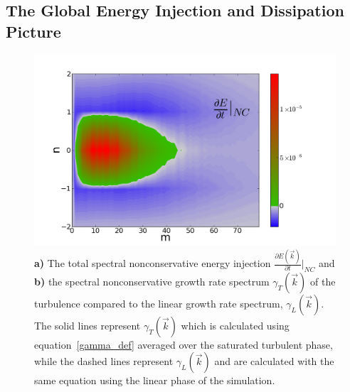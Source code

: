\documentclass[showpacs,preprintnumbers,amsmath,amssymb,superscriptaddress,aip]{revtex4-1}
\newcommand{\pdiff}[2]{\frac{\partial#1}{\partial#2}}
\begin{document}
\subsection{The Global Energy Injection and Dissipation Picture}

\begin{figure}[!htbp]
\includegraphics[]{dEdt_nc}
\hfil
\caption{\textbf{a)} The total spectral nonconservative energy injection $\pdiff{E(\vec{k})}{t} \big|_{NC}$ and
\textbf{b)} the spectral nonconservative growth rate spectrum $\gamma_{T}(\vec{k})$ of the turbulence 
compared to the linear growth rate spectrum, $\gamma_L(\vec{k})$. 
The solid lines represent $\gamma_{T}(\vec{k})$ which is calculated using equation~\ref{gamma_def} averaged over the saturated turbulent phase, 
while the dashed lines represent $\gamma_L(\vec{k})$ and are calculated with the same equation using the linear phase of the simulation.}
\label{dEdt_tot_fig}
\end{figure}
\end{document}
